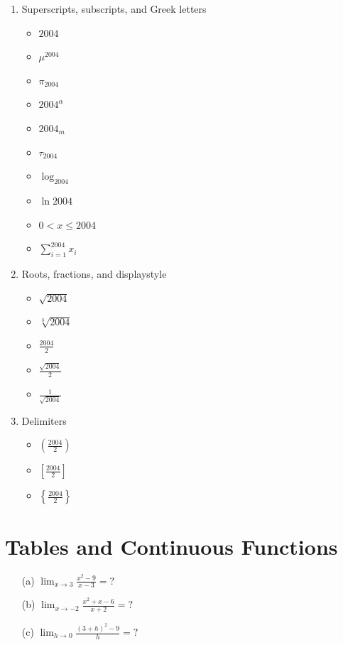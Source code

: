 \documentclass[12pt]{article}
\begin{document}
\begin{enumerate}
    \item Superscripts, subscripts, and Greek letters
    \begin{itemize}
        \item \(2004\)
        \item \(\mu^{2004}\)
        \item \(\pi_{2004}\)
        \item \(2004^{\alpha}\)
        \item \(2004_m\)
        \item \(\tau_{2004}\)
        \item \(\log_{2004}\)
        \item \(\ln 2004\)
        \item \(0 < x \leq 2004\)
        \item \(\sum_{i=1}^{2004} x_i\)
    \end{itemize}
    \item Roots, fractions, and displaystyle
    \begin{itemize}
        \item \(\sqrt{2004}\)
        \item \(\sqrt[3]{2004}\)
        \item \(\frac{2004}{2}\)
        \item \(\frac{\sqrt{2004}}{2}\)
        \item \(\frac{1}{\sqrt{2004}}\)
    \end{itemize}
    \item Delimiters
    \begin{itemize}
        \item \(\left( \frac{2004}{2} \right)\)
        \item \(\left[ \frac{2004}{2} \right]\)
        \item \(\left\{ \frac{2004}{2} \right\}\)
    \end{itemize}
\end{enumerate}

\section*{Tables and Continuous Functions}
\begin{enumerate}
    \item[(a)] \(\lim_{x \to 3} \frac{x^2 - 9}{x - 3} = ?\)
    \item[(b)] \(\lim_{x \to -2} \frac{x^2 + x - 6}{x + 2} = ?\)
    \item[(c)] \(\lim_{h \to 0} \frac{(3+h)^2 - 9}{h} = ?\)
\end{enumerate}
\end{document}
